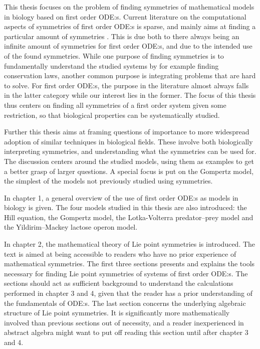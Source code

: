 This thesis focuses on the problem of finding symmetries of mathematical models in biology based on first order ODE:s.
Current literature on the computational aspects of symmetries of first order ODE:s is sparse, and mainly aims at finding a particular amount of symmetries \cite{chebterrab1997computer,chebterrab1998patterns}.
This is due both to there always being an infinite amount of symmetries for first order ODE:s, and due to the intended use of the found symmetries.
While one purpose of finding symmetries is to fundamentally understand the studied systems by for example finding conservation laws, another common purpose is integrating problems that are hard to solve.
For first order ODE:s, the purpose in the literature almost always falls in the latter category while our interest lies in the former.
The focus of this thesis thus centers on finding all symmetries of a first order system given some restriction, so that biological properties can be systematically studied.

Further this thesis aims at framing questions of importance to more widespread adoption of similar techniques in biological fields.
These involve both biologically interpreting symmetries, and understanding what the symmetries can be used for.
The discussion centers around the studied models, using them as examples to get a better grasp of larger questions.
A special focus is put on the Gompertz model, the simplest of the models not previously studied using symmetries.

In chapter 1, a general overview of the use of first order ODE:s as models in biology is given.
The four models studied in this thesis are also introduced: the Hill equation, the Gompertz model, the Lotka-Volterra predator--prey model and the Yildirim--Mackey lactose operon model.

In chapter 2, the mathematical theory of Lie point symmetries is introduced.
The text is aimed at being accessible to readers who have no prior experience of mathematical symmetries.
The first three sections presents and explains the tools necessary for finding Lie point symmetries of systems of first order ODE:s.
The sections should act as sufficient background to understand the calculations performed in chapter 3 and 4, given that the reader has a prior understanding of the fundamentals of ODE:s.
The last section concerns the underlying algebraic structure of Lie point symmetries.
It is significantly more mathematically involved than previous sections out of necessity, and a reader inexperienced in abstract algebra might want to put off reading this section until after chapter 3 and 4.

